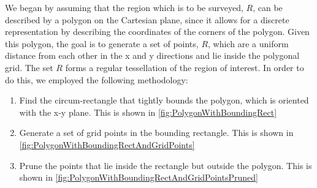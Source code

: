 We began by assuming that the region which is to be surveyed, $R$, can be described by a polygon on the Cartesian plane, since it allows for a discrete representation by describing the coordinates of the corners of the polygon. 
Given this polygon, the goal is to generate a set of points, $R$, which are a uniform distance from each other in the x and y directions and lie inside the polygonal grid. The set $R$ forms a regular tessellation of the region of interest. In order to do this, we employed the following methodology:
\begin{enumerate}
    \item Find the circum-rectangle that tightly bounds the polygon, which is oriented with the x-y plane. This is shown in \ref{fig:PolygonWithBoundingRect}
    \item Generate a set of grid points in the bounding rectangle. This is shown in \ref{fig:PolygonWithBoundingRectAndGridPoints}
    \item Prune the points that lie inside the rectangle but outside the polygon. This is shown in \ref{fig:PolygonWithBoundingRectAndGridPointsPruned}
\end{enumerate}

